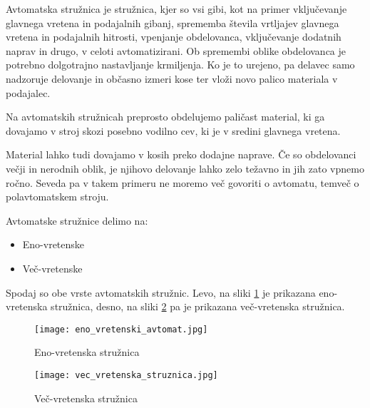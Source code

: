 Avtomatska stružnica je stružnica, kjer so vsi 
gibi, kot na primer vključevanje glavnega vretena 
in podajalnih gibanj, sprememba števila vrtljajev 
glavnega vretena in podajalnih hitrosti, vpenjanje 
obdelovanca, vključevanje dodatnih naprav in drugo, 
v celoti avtomatizirani. Ob spremembi oblike 
obdelovanca je potrebno dolgotrajno nastavljanje krmiljenja.
Ko je to urejeno, pa delavec samo nadzoruje delovanje 
in občasno izmeri kose ter vloži novo palico materiala 
v podajalec.

Na avtomatskih stružnicah preprosto obdelujemo paličast
material, ki ga dovajamo v stroj skozi posebno vodilno 
cev, ki je v sredini glavnega vretena.

Material lahko tudi dovajamo v kosih preko dodajne 
naprave. Če so obdelovanci večji in 
nerodnih oblik, je njihovo delovanje lahko zelo težavno
in jih zato vpnemo ročno. Seveda pa v takem primeru 
ne moremo več govoriti o avtomatu, temveč o 
polavtomatskem stroju.

\noindent Avtomatske stružnice delimo na:
\begin{itemize}
    \item Eno-vretenske
    \item Več-vretenske
\end{itemize}

Spodaj so obe vrste avtomatskih stružnic. Levo, na sliki \ref{eno_vretenska_struznica}
je prikazana eno-vretenska stružnica, desno, na sliki \ref{vec_vretenska_struznica} 
pa je prikazana več-vretenska stružnica.

\begin{multicols}{2}
    \begin{figure}[H]
        \texttt{[image: eno\_vretenski\_avtomat.jpg]}
        \caption{Eno-vretenska stružnica
            \cite{eno_vretenska_struznica}}
        \label{eno_vretenska_struznica}
    \end{figure}

    \columnbreak

    \begin{figure}[H]
        \texttt{[image: vec\_vretenska\_struznica.jpg]}
        \caption{Več-vretenska stružnica
            \cite{vec_vretenska_struznica}}
        \label{vec_vretenska_struznica}
    \end{figure}
\end{multicols}